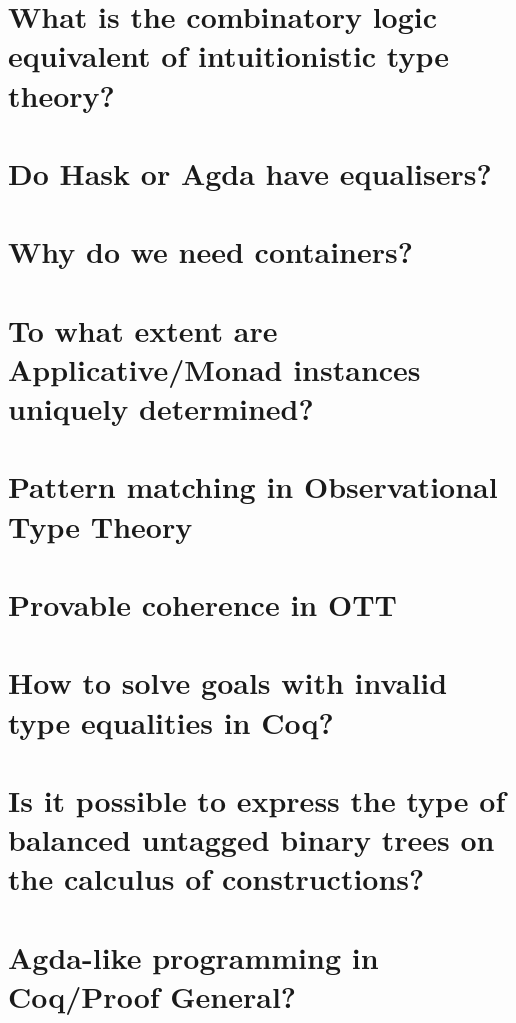 \documentclass{book}%
\begin{document}
\section{What is the combinatory logic equivalent of intuitionistic type theory?}


\section{Do Hask or Agda have equalisers?}


\section{Why do we need containers?}


\section{To what extent are Applicative/Monad instances uniquely determined?}


\section{Pattern matching in Observational Type Theory}


\section{Provable coherence in OTT}


\section{How to solve goals with invalid type equalities in Coq?}


\section{Is it possible to express the type of balanced untagged binary trees on the calculus of constructions?}


\section{Agda-like programming in Coq/Proof General?}

\end{document}
